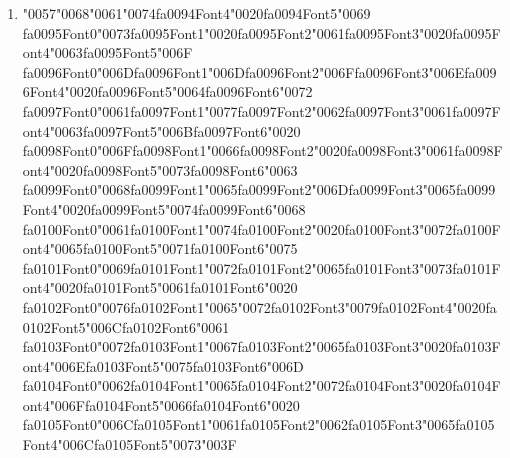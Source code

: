 \documentclass[11pt]{article}
\begin{document}
\begin{enumerate}[leftmargin=*]
  \item {\char"0057}{\char"0068}{\char"0061}{\char"0074}{\csname fa0094Font4\endcsname\char"0020}{\csname fa0094Font5\endcsname\char"0069} {\csname fa0095Font0\endcsname\char"0073}{\csname fa0095Font1\endcsname\char"0020}{\csname fa0095Font2\endcsname\char"0061}{\csname fa0095Font3\endcsname\char"0020}{\csname fa0095Font4\endcsname\char"0063}{\csname fa0095Font5\endcsname\char"006F} {\csname fa0096Font0\endcsname\char"006D}{\csname fa0096Font1\endcsname\char"006D}{\csname fa0096Font2\endcsname\char"006F}{\csname fa0096Font3\endcsname\char"006E}{\csname fa0096Font4\endcsname\char"0020}{\csname fa0096Font5\endcsname\char"0064}{\csname fa0096Font6\endcsname\char"0072} {\csname fa0097Font0\endcsname\char"0061}{\csname fa0097Font1\endcsname\char"0077}{\csname fa0097Font2\endcsname\char"0062}{\csname fa0097Font3\endcsname\char"0061}{\csname fa0097Font4\endcsname\char"0063}{\csname fa0097Font5\endcsname\char"006B}{\csname fa0097Font6\endcsname\char"0020} {\csname fa0098Font0\endcsname\char"006F}{\csname fa0098Font1\endcsname\char"0066}{\csname fa0098Font2\endcsname\char"0020}{\csname fa0098Font3\endcsname\char"0061}{\csname fa0098Font4\endcsname\char"0020}{\csname fa0098Font5\endcsname\char"0073}{\csname fa0098Font6\endcsname\char"0063} {\csname fa0099Font0\endcsname\char"0068}{\csname fa0099Font1\endcsname\char"0065}{\csname fa0099Font2\endcsname\char"006D}{\csname fa0099Font3\endcsname\char"0065}{\csname fa0099Font4\endcsname\char"0020}{\csname fa0099Font5\endcsname\char"0074}{\csname fa0099Font6\endcsname\char"0068} {\csname fa0100Font0\endcsname\char"0061}{\csname fa0100Font1\endcsname\char"0074}{\csname fa0100Font2\endcsname\char"0020}{\csname fa0100Font3\endcsname\char"0072}{\csname fa0100Font4\endcsname\char"0065}{\csname fa0100Font5\endcsname\char"0071}{\csname fa0100Font6\endcsname\char"0075} {\csname fa0101Font0\endcsname\char"0069}{\csname fa0101Font1\endcsname\char"0072}{\csname fa0101Font2\endcsname\char"0065}{\csname fa0101Font3\endcsname\char"0073}{\csname fa0101Font4\endcsname\char"0020}{\csname fa0101Font5\endcsname\char"0061}{\csname fa0101Font6\endcsname\char"0020} {\csname fa0102Font0\endcsname\char"0076}{\csname fa0102Font1\endcsname\char"0065}{\char"0072}{\csname fa0102Font3\endcsname\char"0079}{\csname fa0102Font4\endcsname\char"0020}{\csname fa0102Font5\endcsname\char"006C}{\csname fa0102Font6\endcsname\char"0061} {\csname fa0103Font0\endcsname\char"0072}{\csname fa0103Font1\endcsname\char"0067}{\csname fa0103Font2\endcsname\char"0065}{\csname fa0103Font3\endcsname\char"0020}{\csname fa0103Font4\endcsname\char"006E}{\csname fa0103Font5\endcsname\char"0075}{\csname fa0103Font6\endcsname\char"006D} {\csname fa0104Font0\endcsname\char"0062}{\csname fa0104Font1\endcsname\char"0065}{\csname fa0104Font2\endcsname\char"0072}{\csname fa0104Font3\endcsname\char"0020}{\csname fa0104Font4\endcsname\char"006F}{\csname fa0104Font5\endcsname\char"0066}{\csname fa0104Font6\endcsname\char"0020} {\csname fa0105Font0\endcsname\char"006C}{\csname fa0105Font1\endcsname\char"0061}{\csname fa0105Font2\endcsname\char"0062}{\csname fa0105Font3\endcsname\char"0065}{\csname fa0105Font4\endcsname\char"006C}{\csname fa0105Font5\endcsname\char"0073}{\char"003F}

\end{enumerate}
\end{document}
